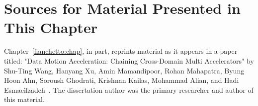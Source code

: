 \section{Sources for Material Presented in This Chapter}
%
Chapter~\ref{fianchetto:chap}, in part, reprints material as it appears in a paper titled: "Data Motion Acceleration: Chaining Cross-Domain Multi Accelerators"
by Shu-Ting Wang, Hanyang Xu, Amin Mamandipoor, Rohan Mahapatra, Byung Hoon Ahn, 
Soroush Ghodrati, Krishnan Kailas, Mohammad Alian, and Hadi Esmaeilzadeh~\cite{dmx:hpca:2024}.
% 
The dissertation author was the primary researcher and author of this material.